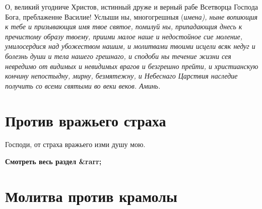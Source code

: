 О, великий угодниче Христов, истинный друже и верный рабе Всетворца Господа Бога, преблаженне Василие! Услыши ны, многогрешныя (\itshape имена\normalfont{}), ныне вопиющия к тебе и призывающия имя твое святое, помилуй ны, припадающия днесь к пречистому образу твоему, приими малое наше и недостойное сие моление, умилосердися над убожеством нашим, и молитвами твоими исцели всяк недуг и болезнь души и тела нашего грешнаго, и сподоби ны течение жизни сея невредимо от видимых и невидимых врагов и безгрешно прейти, и христианскую кончину непостыдну, мирну, безмятежну, и Небеснаго Царствия наследие получить со всеми святыми во веки веков. Аминь.


\section{Против вражьего страха}
 


Господи, от страха вражьего изми душу мою. 


\mychapterending


\bfseries Смотреть весь раздел &rarr;\normalfont{} 

\section{Молитва против крамолы}
 


